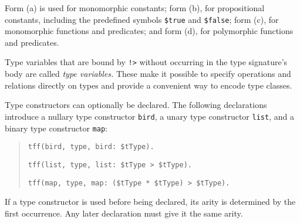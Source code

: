 Form (a) is used for monomorphic constants; form (b), for
propositional constants, including the predefined symbols {\tt \$true} and
{\tt \$false}; form (c), for monomorphic functions and predicates;
and form (d), for polymorphic functions and predicates.



Type variables that are bound by {\tt !>} without
occurring in the type signature's body are called \emph{\theghost{} type variables.}
These make it possible to specify operations and relations directly on types and
provide a convenient way to encode type classes.


 Type constructors
can optionally be declared.
The following declarations introduce a nullary type
constructor {\tt bird}, a unary type constructor {\tt list},
and a binary type constructor {\tt map}:
\begin{quote}
\verb+tff(bird, type, bird: $tType).+
\par
\verb+tff(list, type, list: $tType > $tType).+
\par
\verb+tff(map, type, map: ($tType * $tType) > $tType).+
\end{quote}
If a type constructor is used before being declared, its arity is
determined by the first occurrence. Any later declaration
must give it the same arity.

